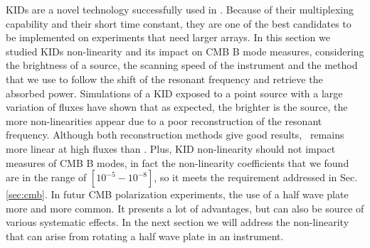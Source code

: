 KIDs are a novel technology successfully used in \nikad . Because of their multiplexing capability and their short time constant, they are one of the best candidates to be implemented on experiments that need larger arrays. In this section we studied KIDs non-linearity and its impact on CMB B mode measures, considering the brightness of a source, the scanning speed of the instrument and the method that we use to follow the shift of the resonant frequency and retrieve the absorbed power.
Simulations of a KID exposed to a point source with a large variation of fluxes have shown that as expected, the brighter is the source, the more non-linearities appear due to a poor reconstruction of the resonant frequency. Although both reconstruction methods give good results, \cf\ remains more linear at high fluxes than \rf . Plus, KID non-linearity should not impact measures of CMB B modes, in fact the non-linearity coefficients that we found are in the range of $[10^{-5} - 10^{-8}]$, so it meets the requirement addressed in Sec.\ref{sec:cmb}.
In futur CMB polarization experiments, the use of a half wave plate more and more common. It presents a lot of advantages, but can also be source of various systematic effects. In the next section we will address the non-linearity that can arise from rotating a half wave plate in an instrument.
